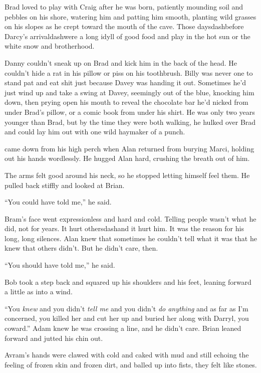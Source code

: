 Brad loved to play with Craig after he was born, patiently mounding
soil and pebbles on his shore, watering him and patting him smooth,
planting wild grasses on his slopes as he crept toward the mouth of
the cave.  Those daysdash{}before Darcy's arrivaldash{}were a long idyll of
good food and play in the hot sun or the white snow and brotherhood.

Danny couldn't sneak up on Brad and kick him in the back of the head. 
He couldn't hide a rat in his pillow or piss on his toothbrush.  Billy
was never one to stand pat and eat shit just because Davey was handing
it out.  Sometimes he'd just wind up and take a swing at Davey,
seemingly out of the blue, knocking him down, then prying open his
mouth to reveal the chocolate bar he'd nicked from under Brad's
pillow, or a comic book from under his shirt.  He was only two years
younger than Brad, but by the time they were both walking, he hulked
over Brad and could lay him out with one wild haymaker of a punch.

 came down from his high perch when Alan returned from burying
Marci, holding out his hands wordlessly.  He hugged Alan hard,
crushing the breath out of him.

The arms felt good around his neck, so he stopped letting himself feel
them.  He pulled back stiffly and looked at Brian.

``You could have told me,'' he said.

Bram's face went expressionless and hard and cold.  Telling people
wasn't what he did, not for years.  It hurt othersdash{}and it hurt him. 
It was the reason for his long, long silences.  Alan knew that
sometimes he couldn't tell what it was that he knew that others
didn't.  But he didn't care, then.

``You should have told me,'' he said.

Bob took a step back and squared up his shoulders and his feet,
leaning forward a little as into a wind.

``You \textit{knew} and you didn't \textit{tell me} and you didn't
\textit{do anything} and as far as I'm concerned, you killed her and
cut her up and buried her along with Darryl, you coward.'' Adam knew
he was crossing a line, and he didn't care.  Brian leaned forward and
jutted his chin out.

Avram's hands were clawed with cold and caked with mud and still
echoing the feeling of frozen skin and frozen dirt, and balled up into
fists, they felt like stones.

